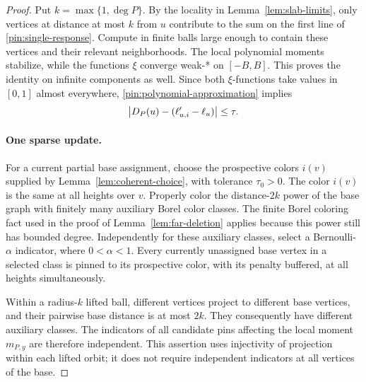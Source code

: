 \begin{proof}
Put $k=\max\{1,\deg P\}$.  By the locality in
Lemma~\ref{lem:slab-limits}, only vertices at distance at most $k$ from
$u$ contribute to the sum on the first line of
\eqref{pin:single-response}.  Compute in finite balls large enough to
contain these vertices and their relevant neighborhoods.  The local
polynomial moments stabilize, while the functions $\xi$ converge
weak-* on $[-B,B]$.  This proves the identity on infinite components
as well.  Since both $\xi$-functions take values in $[0,1]$ almost
everywhere, \eqref{pin:polynomial-approximation} implies
\begin{equation}\label{pin:single-error}
 \left|D_P(u)-(\ell_{u,i}'-\ell_u)\right|\leq\tau.
\end{equation}

\paragraph{One sparse update.}
For a current partial base assignment, choose the prospective colors
$i(v)$ supplied by Lemma~\ref{lem:coherent-choice}, with tolerance
$\tau_0>0$.  The color $i(v)$ is the same at all heights over $v$.
Properly color the distance-$2k$ power of the base graph with finitely
many auxiliary Borel color classes.  The finite Borel coloring fact
used in the proof of Lemma~\ref{lem:far-deletion} applies because this
power still has bounded degree.  Independently for these auxiliary
classes, select a Bernoulli-$\alpha$ indicator, where $0<\alpha<1$.
Every currently unassigned base vertex in a selected class is pinned to
its prospective color, with its penalty buffered, at all heights
simultaneously.

Within a radius-$k$ lifted ball, different vertices project to different
base vertices, and their pairwise base distance is at most $2k$.
They consequently have different auxiliary classes.  The indicators of
all candidate pins affecting the local moment $m_{P,y}$ are therefore
independent.  This assertion uses injectivity of projection within
each lifted orbit; it does not require independent indicators at all
vertices of the base.


\end{proof}
